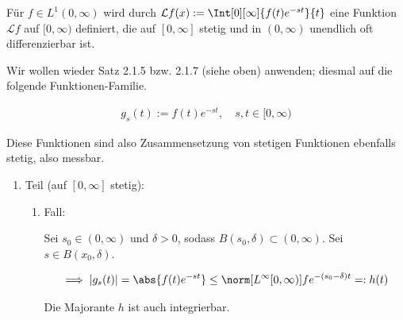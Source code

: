 
\begin{exercise}

Für $f \in L^1(0, \infty)$ wird durch $\mathcal{L} f(x) := \Int[0][\infty]{f(t) e^{-s t}}{t}$ eine Funktion $\mathcal{L} f$ auf $[0, \infty)$ definiert, die auf $[0, \infty]$ stetig und in $(0, \infty)$ unendlich oft differenzierbar ist.

\end{exercise}


\begin{solution}

Wir wollen wieder Satz 2.1.5 bzw. 2.1.7 (siehe oben) anwenden; diesmal auf die folgende Funktionen-Familie.

\begin{align*}
    g_s(t)
    :=
    f(t) e^{-s t},
    \quad
    s, t \in [0, \infty)
\end{align*}

Diese Funktionen sind also Zusammensetzung von stetigen Funktionen ebenfalls stetig, also messbar.

\begin{enumerate}[label = \arabic*.]

    \item Teil (auf $[0, \infty]$ stetig):
    
    \begin{enumerate}[label = \arabic*.]

        \item Fall:
        
        Sei $s_0 \in (0, \infty)$ und $\delta > 0$, sodass $B(s_0, \delta) \subset (0, \infty)$.
        Sei $s \in B(x_0, \delta)$.
    
        \begin{align*}
            \implies
            |g_s(t)|
            =
            \abs
            {
                f(t) e^{-s t}
            }
            \leq
            \norm[{L^\infty[0, \infty)}]{f}
            e^{-(s_0 - \delta) t}
            =:
            h(t)
        \end{align*}

        Die Majorante $h$ ist auch integrierbar.


\end{enumerate}
\end{enumerate}
\end{solution}
